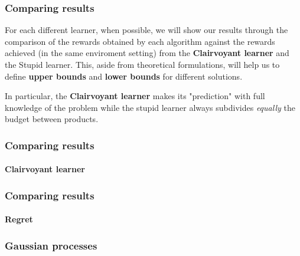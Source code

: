 
\begin{frame}

\frametitle{Comparing results}

For each different learner, when possible, we will show our results through the comparison of the rewards obtained by each algorithm against the rewards achieved (in the same enviroment setting) from the \textbf{Clairvoyant learner} and the Stupid learner.
This, aside from theoretical formulations, will help us to define \textbf{upper bounds} and \textbf{lower bounds} for different solutions.

In particular, the \textbf{Clairvoyant learner} makes its "prediction" with full knowledge of the problem while the stupid learner always subdivides \textit{equally} the budget between products.

\end{frame}


\begin{frame}

\frametitle{Comparing results}
\framesubtitle{Clairvoyant learner}


\end{frame}


\begin{frame}

\frametitle{Comparing results}
\framesubtitle{Regret}


\end{frame}


\begin{frame}

\frametitle{Gaussian processes}


\end{frame}


